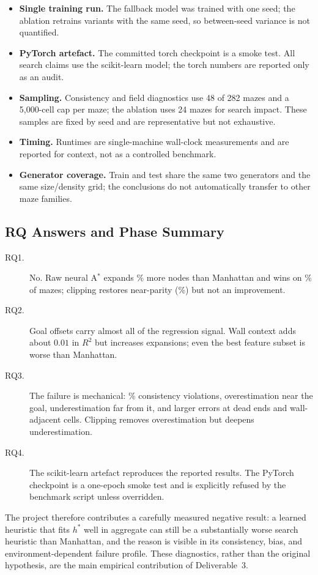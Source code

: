 \begin{itemize}
  \item \textbf{Single training run.} The fallback model was trained with one seed; the
  ablation retrains variants with the same seed, so between-seed variance is not
  quantified.
  \item \textbf{PyTorch artefact.} The committed torch checkpoint is a smoke test. All
  search claims use the scikit-learn model; the torch numbers are reported only as an
  audit.
  \item \textbf{Sampling.} Consistency and field diagnostics use 48 of 282 mazes and a
  5{,}000-cell cap per maze; the ablation uses 24 mazes for search impact. These samples
  are fixed by seed and are representative but not exhaustive.
  \item \textbf{Timing.} Runtimes are single-machine wall-clock measurements and are
  reported for context, not as a controlled benchmark.
  \item \textbf{Generator coverage.} Train and test share the same two generators and
  the same size/density grid; the conclusions do not automatically transfer to other
  maze families.
\end{itemize}

\subsection{RQ Answers and Phase Summary}

\begin{description}
  \item[RQ1.] No. Raw neural A$^\ast$ expands \PfiveRawRelative{}\% more nodes than
  Manhattan and wins on \PfiveRawWins{}\% of mazes; clipping restores near-parity
  (\PfiveClipRelative{}\%) but not an improvement.
  \item[RQ2.] Goal offsets carry almost all of the regression signal. Wall context adds
  about $0.01$ in $R^2$ but increases expansions; even the best feature subset is worse
  than Manhattan.
  \item[RQ3.] The failure is mechanical: \PfiveConsistencyRaw{}\% consistency
  violations, overestimation near the goal, underestimation far from it, and larger
  errors at dead ends and wall-adjacent cells. Clipping removes overestimation but
  deepens underestimation.
  \item[RQ4.] The scikit-learn artefact reproduces the reported results. The PyTorch
  checkpoint is a one-epoch smoke test and is explicitly refused by the benchmark script
  unless overridden.
\end{description}

The project therefore contributes a carefully measured negative result: a learned
heuristic that fits $h^\ast$ well in aggregate can still be a substantially worse search
heuristic than Manhattan, and the reason is visible in its consistency, bias, and
environment-dependent failure profile. These diagnostics, rather than the original
hypothesis, are the main empirical contribution of Deliverable~3.
